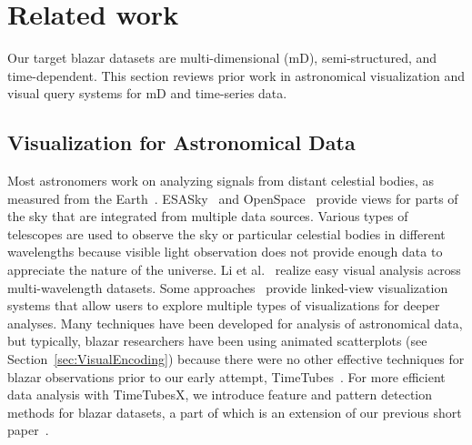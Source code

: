 \section{Related work\label{sec:relatedWork}}
Our target blazar datasets are multi-dimensional (mD), semi-structured, and time-dependent.
This section reviews prior work in astronomical visualization and visual query systems for mD and time-series data. 


\subsection{Visualization for Astronomical Data}\label{sec:relatedAstronomy}
Most astronomers work on analyzing signals from distant celestial bodies, as measured from the Earth~\cite{Kent2017}. 
ESASky~\cite{Baines2017} and OpenSpace~\cite{Bock2020} provide views for parts of the sky that are integrated from multiple data sources.
Various types of telescopes are used to observe the sky or particular celestial bodies in different wavelengths 
because visible light observation does not provide enough data to appreciate the nature of the universe.
Li et al.~\cite{Li2008} realize easy visual analysis across multi-wavelength datasets.
Some approaches~\cite{Haroz2008, Li2008, Preston2016, McCurdy2019} provide linked-view visualization systems that allow users to explore multiple types of visualizations for deeper analyses.
Many techniques have been developed for analysis of astronomical data, 
but typically, blazar researchers have been using animated scatterplots (see Section~\ref{sec:VisualEncoding}) 
because there were no other effective techniques for blazar observations prior to our early attempt, TimeTubes~\cite{Fujishiro2018}.
For more efficient data analysis with TimeTubesX, we introduce feature and pattern detection methods for blazar datasets, a part of which is an extension of our previous short paper~\cite{Sawada2018}.

